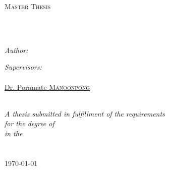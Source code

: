 \frontmatter %

\pagestyle{plain} %


\begin{titlepage}
\begin{center}

{\scshape\LARGE \univname\par}\vspace{1.5cm} %
\textsc{\Large Master Thesis}\\[0.5cm] %

\HRule \\[0.4cm] %
{\huge \bfseries \ttitle\par}\vspace{0.4cm} %
\HRule \\[1.5cm] %
 
\begin{minipage}[t]{0.45\textwidth}
\begin{flushleft} \large
\emph{Author:}\\
\href{http://www.kitt.evee.cz}{\authorname}
\end{flushleft}
\end{minipage}
\begin{minipage}[t]{0.45\textwidth}
\begin{flushright} \large
\emph{Supervisors:} \\
\href{https://sites.google.com/site/ktomsite/}{\supname} \\
\href{http://manoonpong.com}{Dr. Poramate \textsc{Manoonpong}}
\end{flushright}
\end{minipage}\\[3cm]
 
\large \textit{A thesis submitted in fulfillment of the requirements\\ for the degree of \degreename}\\[0.3cm] %
\textit{in the}\\[0.4cm]
\groupname\\\deptname\\[2cm] %
 
{\large \today}\\[4cm] %
 
\vfill
\end{center}
\end{titlepage}